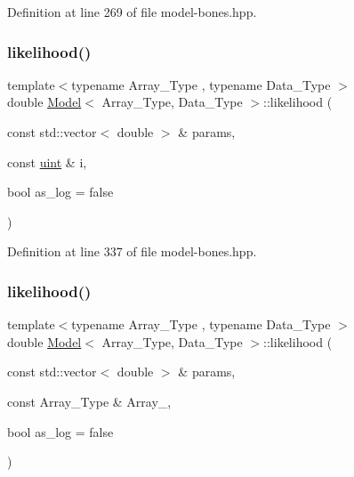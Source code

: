 Definition at line 269 of file model-\/bones.\+hpp.

\mbox{\label{class_model_abc2f255c6b6c4dd0ff3680aab35fd308}} 
\subsubsection{\texorpdfstring{likelihood()}{likelihood()}\hspace{0.1cm}{\footnotesize\ttfamily [1/2]}}
{\footnotesize\ttfamily template$<$typename Array\+\_\+\+Type , typename Data\+\_\+\+Type $>$ \\
double \hyperlink{class_model}{Model}$<$ Array\+\_\+\+Type, Data\+\_\+\+Type $>$\+::likelihood (\begin{DoxyParamCaption}\item[{const std\+::vector$<$ double $>$ \&}]{params,  }\item[{const \hyperlink{typedefs_8hpp_a91ad9478d81a7aaf2593e8d9c3d06a14}{uint} \&}]{i,  }\item[{bool}]{as\+\_\+log = {\ttfamily false} }\end{DoxyParamCaption})\hspace{0.3cm}{\ttfamily [inline]}}



Definition at line 337 of file model-\/bones.\+hpp.

\mbox{\label{class_model_adf2c30d9c5ffdc87af6813d110146968}} 
\subsubsection{\texorpdfstring{likelihood()}{likelihood()}\hspace{0.1cm}{\footnotesize\ttfamily [2/2]}}
{\footnotesize\ttfamily template$<$typename Array\+\_\+\+Type , typename Data\+\_\+\+Type $>$ \\
double \hyperlink{class_model}{Model}$<$ Array\+\_\+\+Type, Data\+\_\+\+Type $>$\+::likelihood (\begin{DoxyParamCaption}\item[{const std\+::vector$<$ double $>$ \&}]{params,  }\item[{const Array\+\_\+\+Type \&}]{Array\+\_\+,  }\item[{bool}]{as\+\_\+log = {\ttfamily false} }\end{DoxyParamCaption})\hspace{0.3cm}{\ttfamily [inline]}}



